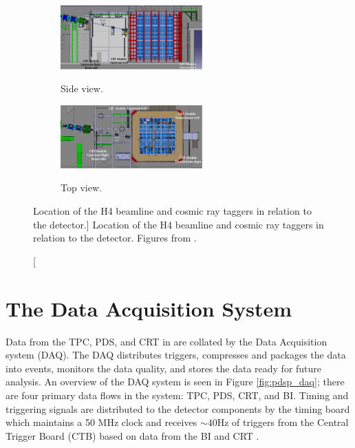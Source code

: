 \begin{figure}

	\centering

	\begin{subfigure}[b]{\textwidth}
		\centering
		\includegraphics[width=0.6\textwidth]{figures/crt_side.pdf}
		\label{fig:crt_side}
		\caption{Side view.}
	\end{subfigure}

	\vspace{3mm}

	\begin{subfigure}[b]{\textwidth}
		\centering
		\includegraphics[width=0.6\textwidth]{figures/crt_top.pdf}
		\label{fig:crt_top}
		\caption{Top view.}
	\end{subfigure}

	\caption
	[Location of the H4 beamline and cosmic ray taggers in relation to the
	\protodune{} detector.]
	{Location of the H4 beamline and cosmic ray taggers in relation to the
	\protodune{} detector. Figures from \cite{protoduneperf}.}

	\label{fig:pdsp_CRT}

\end{figure}

\section{The Data Acquisition System}

Data from the TPC, PDS, and CRT in \protodune{} are collated by the Data 
Acquisition system (DAQ). The DAQ distributes triggers, compresses and packages 
the data into events, monitors the data quality, and stores the data ready for 
future analysis. An overview of the \protodune{} DAQ system is seen in Figure 
\ref{fig:pdsp_daq}; there are four primary data flows in the system: TPC, PDS,
CRT, and BI. Timing and triggering signals are distributed to the detector 
components by the timing board which maintains a 50 MHz clock and receives 
$\sim 40 \mbox{Hz}$ of triggers from the Central Trigger Board (CTB) based on 
data from the BI and CRT \cite{Abi2017}.

